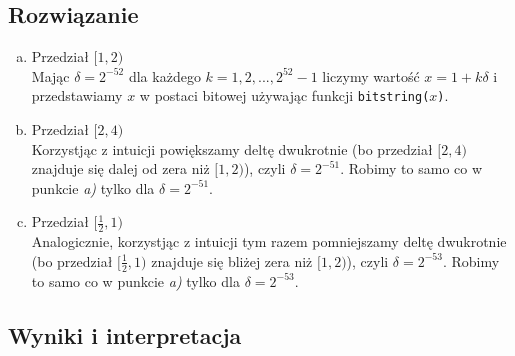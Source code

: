 \documentclass[a4paper]{article}
\begin{document}
    \subsection{Rozwiązanie}
        \begin{enumerate}[a)]
        \item Przedział $[1, 2)$ \\
        Mając \(\delta = 2^{-52}\) dla każdego \(k = 1, 2,..., 2^{52}-1\) liczymy wartość \(x = 1 + k\delta\) i przedstawiamy $x$ w postaci bitowej używając funkcji \texttt{bitstring($x$)}.
        \item Przedział $[2, 4)$ \\
        Korzystjąc z intuicji powiększamy deltę dwukrotnie (bo przedział $[2, 4)$ znajduje się dalej od zera niż $[1, 2)$), czyli  \(\delta = 2^{-51}\). Robimy to samo co w punkcie \emph{a)} tylko dla \(\delta = 2^{-51}\).
        \item Przedział $[\frac{1}{2} , 1)$ \\
        Analogicznie, korzystjąc z intuicji tym razem pomniejszamy deltę dwukrotnie (bo przedział $[\frac{1}{2} , 1)$ znajduje się bliżej zera niż $[1, 2)$), czyli  \(\delta = 2^{-53}\). Robimy to samo co w punkcie \emph{a)} tylko dla \(\delta = 2^{-53}\).
        \end{enumerate}
    
    \subsection{Wyniki i interpretacja}
\end{document}
